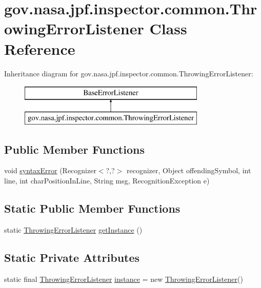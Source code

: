 \hypertarget{classgov_1_1nasa_1_1jpf_1_1inspector_1_1common_1_1_throwing_error_listener}{}\section{gov.\+nasa.\+jpf.\+inspector.\+common.\+Throwing\+Error\+Listener Class Reference}
\label{classgov_1_1nasa_1_1jpf_1_1inspector_1_1common_1_1_throwing_error_listener}
Inheritance diagram for gov.\+nasa.\+jpf.\+inspector.\+common.\+Throwing\+Error\+Listener\+:\begin{figure}[H]
\begin{center}
\leavevmode
\includegraphics[height=2.000000cm]{classgov_1_1nasa_1_1jpf_1_1inspector_1_1common_1_1_throwing_error_listener}
\end{center}
\end{figure}
\subsection*{Public Member Functions}
\begin{DoxyCompactItemize}
\item 
void \hyperlink{classgov_1_1nasa_1_1jpf_1_1inspector_1_1common_1_1_throwing_error_listener_ab4f1962d5c832292836cafc01b491ed1}{syntax\+Error} (Recognizer$<$?,?$>$ recognizer, Object offending\+Symbol, int line, int char\+Position\+In\+Line, String msg, Recognition\+Exception e)
\end{DoxyCompactItemize}
\subsection*{Static Public Member Functions}
\begin{DoxyCompactItemize}
\item 
static \hyperlink{classgov_1_1nasa_1_1jpf_1_1inspector_1_1common_1_1_throwing_error_listener}{Throwing\+Error\+Listener} \hyperlink{classgov_1_1nasa_1_1jpf_1_1inspector_1_1common_1_1_throwing_error_listener_a1f7625a4d50e3e1116e7e3b630d32e9c}{get\+Instance} ()
\end{DoxyCompactItemize}
\subsection*{Static Private Attributes}
\begin{DoxyCompactItemize}
\item 
static final \hyperlink{classgov_1_1nasa_1_1jpf_1_1inspector_1_1common_1_1_throwing_error_listener}{Throwing\+Error\+Listener} \hyperlink{classgov_1_1nasa_1_1jpf_1_1inspector_1_1common_1_1_throwing_error_listener_a8ea73c41d5b12c2c050d725095b49393}{instance} = new \hyperlink{classgov_1_1nasa_1_1jpf_1_1inspector_1_1common_1_1_throwing_error_listener}{Throwing\+Error\+Listener}()
\end{DoxyCompactItemize}



